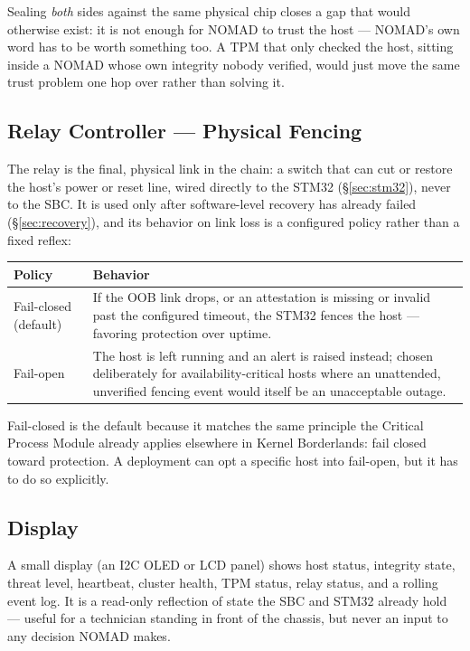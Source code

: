 \documentclass[11pt,a4paper]{article}
\begin{document}
\begin{plainbox}
Sealing \emph{both} sides against the same physical chip closes a gap
that would otherwise exist: it is not enough for NOMAD to trust the host
--- NOMAD's own word has to be worth something too. A TPM that only
checked the host, sitting inside a NOMAD whose own integrity nobody
verified, would just move the same trust problem one hop over rather
than solving it.
\end{plainbox}

\subsection{Relay Controller --- Physical Fencing}

The relay is the final, physical link in the chain: a switch that can
cut or restore the host's power or reset line, wired directly to the
STM32 (\S\ref{sec:stm32}), never to the SBC. It is used only after
software-level recovery has already failed (\S\ref{sec:recovery}), and
its behavior on link loss is a configured policy rather than a fixed
reflex:

\begin{center}
\renewcommand{\arraystretch}{1.3}
\begin{tabular}{@{}p{3.4cm}p{10.3cm}@{}}
\toprule
\textbf{Policy} & \textbf{Behavior} \\
\midrule
Fail-closed (default) & If the OOB link drops, or an attestation is
missing or invalid past the configured timeout, the STM32 fences the
host --- favoring protection over uptime. \\
Fail-open & The host is left running and an alert is raised instead;
chosen deliberately for availability-critical hosts where an
unattended, unverified fencing event would itself be an unacceptable
outage. \\
\bottomrule
\end{tabular}
\end{center}

Fail-closed is the default because it matches the same principle the
Critical Process Module already applies elsewhere in Kernel
Borderlands: fail closed toward protection. A deployment can opt a
specific host into fail-open, but it has to do so explicitly.

\subsection{Display}

A small display (an I2C OLED or LCD panel) shows host status,
integrity state, threat level, heartbeat, cluster health, TPM status,
relay status, and a rolling event log. It is a read-only reflection of
state the SBC and STM32 already hold --- useful for a technician
standing in front of the chassis, but never an input to any decision
NOMAD makes.
\end{document}
